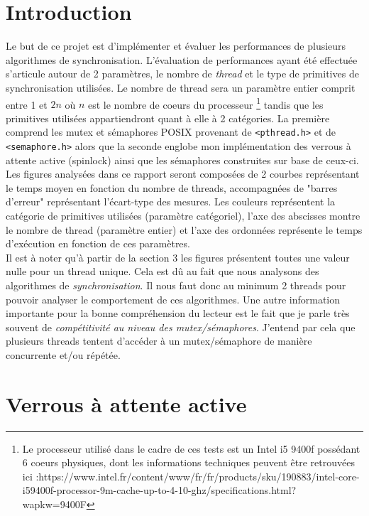 \newpage

\section{Introduction}

Le but de ce projet est d'implémenter et évaluer les performances de plusieurs algorithmes de synchronisation.
L'évaluation de performances ayant été effectuée s'articule autour de 2 paramètres, le nombre de \textit{thread} et le type de primitives de synchronisation utilisées.
Le nombre de thread sera un paramètre entier comprit entre 1 et $2n$ où $n$ est le nombre de coeurs du processeur \footnote{Le processeur utilisé dans le cadre de ces tests est un Intel i5 9400f possédant 6 coeurs physiques, dont les informations techniques peuvent être retrouvées ici :https://www.intel.fr/content/www/fr/fr/products/sku/190883/intel-core-i59400f-processor-9m-cache-up-to-4-10-ghz/specifications.html?wapkw=9400F } tandis que les primitives utilisées appartiendront quant à elle à 2 catégories. 
La première comprend les mutex et sémaphores POSIX provenant de \texttt{<pthread.h>} et de \texttt{<semaphore.h>} alors que la seconde englobe mon implémentation des verrous à attente active (spinlock) ainsi que les sémaphores construites sur base de ceux-ci.\\ 

\noindent Les figures analysées dans ce rapport seront composées de 2 courbes représentant le temps moyen en fonction du nombre de threads, accompagnées de "barres d'erreur" représentant l'écart-type des mesures.
Les couleurs représentent la catégorie de primitives utilisées (paramètre catégoriel), l'axe des abscisses montre le nombre de thread (paramètre entier) et l'axe des ordonnées représente le temps d'exécution en fonction de ces paramètres. \\

\noindent Il est à noter qu'à partir de la section 3 les figures présentent toutes une valeur nulle pour un thread unique. Cela est dû au fait que nous analysons des algorithmes de \textit{synchronisation}.
Il nous faut donc au minimum 2 threads pour pouvoir analyser le comportement de ces algorithmes. Une autre information importante pour la bonne compréhension du lecteur est le fait que je parle très souvent de \textit{compétitivité au niveau des mutex/sémaphores}. J'entend par cela que plusieurs threads tentent d'accéder à un mutex/sémaphore de manière concurrente et/ou répétée.

\section{Verrous à attente active}

